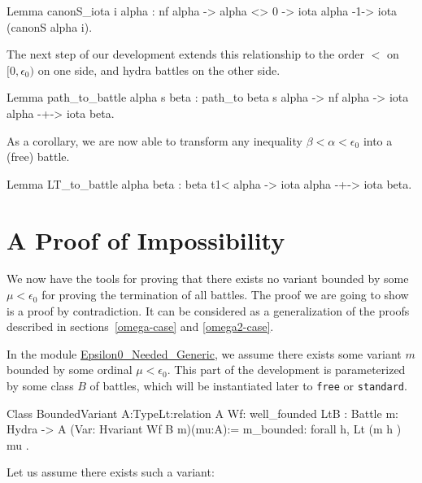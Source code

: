 \label{lemma:canonS-iota}

\begin{Coqsrc}
Lemma canonS_iota i alpha :
    nf alpha -> alpha <> 0 ->
    iota alpha -1-> iota (canonS alpha i).
\end{Coqsrc}
                

The next step of our development extends this relationship to
the order $<$ on $[0,\epsilon_0)$ on one side, and hydra battles on the other side.


\begin{Coqsrc}
Lemma path_to_battle alpha s beta :
  path_to  beta  s alpha -> nf alpha ->
  iota alpha -+-> iota beta.
\end{Coqsrc}

As a corollary, we are now able to transform any inequality $\beta<\alpha<\epsilon_0$ into a (free) battle.

\begin{Coqsrc}
Lemma LT_to_battle alpha beta :
    beta t1< alpha ->  iota alpha -+-> iota beta.
\end{Coqsrc}

\section{A  Proof of Impossibility}

We now have  the tools for proving that  there exists no variant bounded by some $\mu<\epsilon_0$ for proving the termination   of all battles. The proof we are going to show is a proof by contradiction. It  can
 be considered as a generalization of the
proofs described in  sections~\vref{omega-case} and \vref{omega2-case}.



In the module \href{../theories/html/hydras.Hydra.Epsilon0_Needed_Generic.html}{Epsilon0\_Needed\_Generic}, we assume there exists some variant $m$ bounded by some ordinal $\mu<\epsilon_0$. This part of the development is parameterized by some class $B$ of battles, which will be instantiated later to \texttt{free} or \texttt{standard}.




\begin{Coqsrc}
Class BoundedVariant {A:Type}{Lt:relation A}
      {Wf: well_founded Lt}{B : Battle}
      {m: Hydra -> A} (Var: Hvariant  Wf  B m)(mu:A):=
  {
  m_bounded: forall h, Lt (m h ) mu
  }.
\end{Coqsrc}

Let us assume there exists such a variant:

